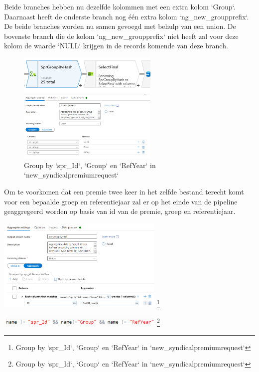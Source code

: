 Beide branches hebben nu dezelfde kolommen met een extra kolom `Group`. Daarnaast heeft de onderste branch nog één extra kolom `ng\_new\_groupprefix`. De beide branches worden nu samen gevoegd met behulp van een union. De bovenste branch die de kolom `ng\_new\_groupprefix` niet heeft zal voor deze kolom de waarde `NULL` krijgen in de records komende van deze branch. 

\begin{figure}[H]
    \centering
    \includegraphics[width=0.6\textwidth]{./graphics/adf/group_by_1.png}
    \caption{Group by `spr\_Id`, `Group` en `RefYear` in `new\_syndicalpremiumrequest`}
    \label{fig:groupby}
\end{figure}

Om te voorkomen dat een premie twee keer in het zelfde bestand terecht komt voor een bepaalde groep en referentiejaar zal er op het einde van de pipeline geaggregeerd worden op basis van id van de premie, groep en referentiejaar.

\begin{center}
    \includegraphics[width=0.6\textwidth]{./graphics/adf/group_by_2.png}
    \footnote{Group by `spr\_Id`, `Group` en `RefYear` in `new\_syndicalpremiumrequest`}
\end{center}

\begin{center}
    \includegraphics[width=0.6\textwidth]{./graphics/adf/group_by_3.png}
    \footnote{Group by `spr\_Id`, `Group` en `RefYear` in `new\_syndicalpremiumrequest`}
\end{center}

